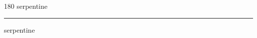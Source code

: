 
\begin{frame}
\begin{center}
\begin{turn}{180}
{\fontsize{2.5cm}{1em}\selectfont serpentine}
\end{turn}
\vspace{1em}\par  
\hrule
\vspace{1em}\par  
{\fontsize{2.5cm}{1em}\selectfont serpentine}
\end{center}
\end{frame}
